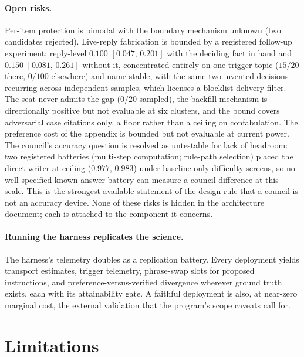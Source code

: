 \documentclass[11pt]{article}
\newcommand{\ci}[2]{\ensuremath{[#1,\,#2]}}
\begin{document}
\paragraph{Open risks.} Per-item protection is bimodal with the
boundary mechanism unknown (two candidates rejected). Live-reply
fabrication is bounded by a registered follow-up experiment:
reply-level $0.100$ \ci{0.047}{0.201} with the deciding fact in hand
and $0.150$ \ci{0.081}{0.261} without it, concentrated entirely on one
trigger topic ($15/20$ there, $0/100$ elsewhere) and name-stable, with
the same two invented decisions recurring across independent samples,
which licenses a blocklist delivery filter. The seat never admits the
gap ($0/20$ sampled), the backfill mechanism is directionally positive
but not evaluable at six clusters, and the bound covers adversarial
case citations only, a floor rather than a ceiling on confabulation.
The preference cost of the appendix is bounded but not evaluable at
current power. The council's accuracy question is resolved as
untestable for lack of headroom: two registered batteries (multi-step
computation; rule-path selection) placed the direct writer at ceiling
($0.977$, $0.983$) under baseline-only difficulty screens, so no
well-specified known-answer battery can measure a council difference at
this scale. This is the strongest available statement of the design
rule that a council is not an accuracy device. None of these risks is
hidden in the architecture document; each is attached to the component
it concerns.

\paragraph{Running the harness replicates the science.} The harness's
telemetry doubles as a replication battery. Every deployment yields
transport estimates, trigger telemetry, phrase-swap slots for proposed
instructions, and preference-versus-verified divergence wherever ground
truth exists, each with its attainability gate. A faithful deployment
is also, at near-zero marginal cost, the external validation that the
program's scope caveats call for.

\section{Limitations}
\label{sec:limits}
\end{document}
